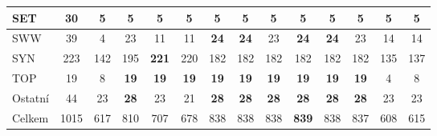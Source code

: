 \begin{longtable}{l|c|c|c|c|c|c|c|c|c|c|c|c|c}
\hline
{\footnotesize SET} & {\footnotesize 30} & \textbf{5} & \textbf{5} & \textbf{5} & \textbf{5} & \textbf{5} & \textbf{5} & \textbf{5} & \textbf{5} & \textbf{5} & \textbf{5} & \textbf{5} & \textbf{5}\\
\hline
{\footnotesize SWW} & {\footnotesize 39} & {\footnotesize 4} & {\footnotesize 23} & {\footnotesize 11} & {\footnotesize 11} & \textbf{24} & \textbf{24} & {\footnotesize 23} & \textbf{24} & \textbf{24} & {\footnotesize 23} & {\footnotesize 14} & {\footnotesize 14}\\
\hline
{\footnotesize SYN} & {\footnotesize 223} & {\footnotesize 142} & {\footnotesize 195} & \textbf{221} & {\footnotesize 220} & {\footnotesize 182} & {\footnotesize 182} & {\footnotesize 182} & {\footnotesize 182} & {\footnotesize 182} & {\footnotesize 182} & {\footnotesize 135} & {\footnotesize 137}\\
\hline
{\footnotesize TOP} & {\footnotesize 19} & {\footnotesize 8} & \textbf{19} & \textbf{19} & \textbf{19} & \textbf{19} & \textbf{19} & \textbf{19} & \textbf{19} & \textbf{19} & \textbf{19} & {\footnotesize 4} & {\footnotesize 8}\\
\hline
{\footnotesize Ostatní} & {\footnotesize 44} & {\footnotesize 23} & \textbf{28} & {\footnotesize 23} & {\footnotesize 21} & \textbf{28} & \textbf{28} & \textbf{28} & \textbf{28} & \textbf{28} & \textbf{28} & {\footnotesize 23} & {\footnotesize 23}\\
\hline
\hline
{\footnotesize Celkem} & {\footnotesize 1015} & {\footnotesize 617} & {\footnotesize 810} & {\footnotesize 707} & {\footnotesize 678} & {\footnotesize 838} & {\footnotesize 838} & {\footnotesize 838} & \textbf{839} & {\footnotesize 838} & {\footnotesize 837} & {\footnotesize 608} & {\footnotesize 615}\\
\hline
\end{longtable}
